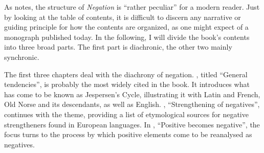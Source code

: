 \documentclass[output=chapter]{langscibook}
\begin{document}
As \citet[29]{McCawley1995} notes, the structure of \textit{Negation} is ``rather peculiar'' for a modern reader. Just by looking at the table of contents, it is difficult to discern any narrative or guiding principle for how the contents are organized, as one might expect of a monograph published today. In the following, I will divide the book’s contents into three broad parts. The first part is diachronic, the other two mainly synchronic.

The first three chapters deal with the diachrony of negation. , titled ``General tendencies'', is probably the most widely cited in the book. It introduces what has come to be known as Jespersen's Cycle, illustrating it with Latin and French, Old Norse and its descendants, as well as English. , ``Strengthening of negatives'', continues with the theme, providing a list of etymological sources for negative strengtheners found in European languages. In , ``Positive becomes negative'', the focus turns to the process by which positive elements come to be reanalysed as negatives.
\end{document}
